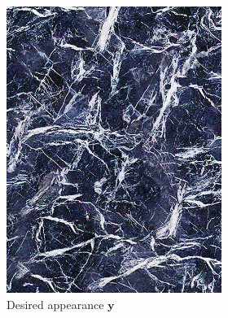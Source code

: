 \begin{figure}[]
    \centering    
    \begin{subfigure}{\textwidth}
        \centering
        \begin{subfigure}{0.2\textwidth}
            \centering
            \includegraphics[width=\textwidth]{images/04-experiment02/human/marble/target.jpg}
            \caption*{Desired appearance \(\bm{y}\)}
        \end{subfigure}
        \hfill
        \begin{subfigure}{0.78\textwidth}
            \centering
            \begin{subfigure}{0.32\textwidth}
                \centering
                \begin{tikzpicture}

\end{tikzpicture}
\end{subfigure}
\end{subfigure}
\end{subfigure}
\end{figure}
